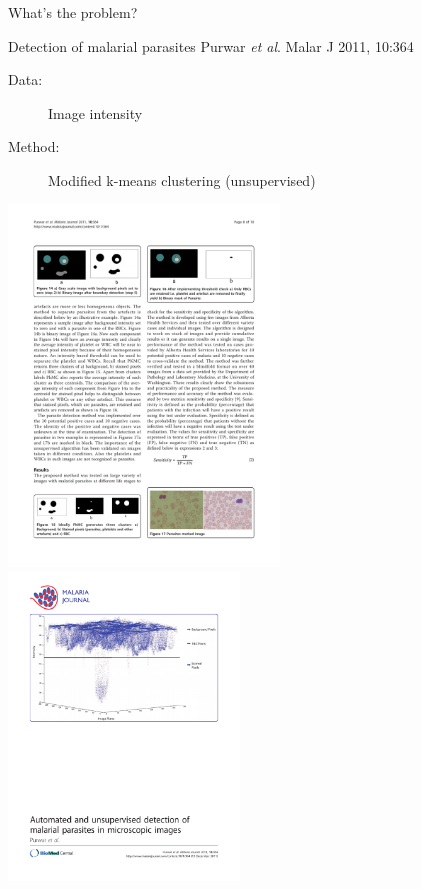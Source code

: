 \documentclass[pdf]{beamer}
\begin{document}
\begin{frame}{What's the problem?}
\begin{exampleblock}{Detection of malarial parasites \vskip-1mm{\tiny Purwar \textit{et al}. Malar J 2011, 10:364}}
\begin{description}
	\item[Data:] Image intensity
	\item[Method:] Modified k-means clustering (unsupervised)
\end{description}
\begin{center}
	\includegraphics[width=0.54\textwidth]{purwar02.pdf}
	\includegraphics[width=0.46\textwidth]{purwar01.pdf}
\end{center}
\end{exampleblock}
\end{frame}
\end{document}
